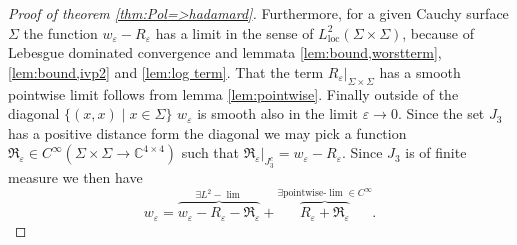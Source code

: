 \documentclass[b5paper,draft,openbib,12pt]{memoir}
\begin{document}
\begin{proof}[Proof of theorem \ref{thm:Pol=>hadamard}]
Furthermore, for a given Cauchy surface \(\Sigma\) the function \(w_\varepsilon-R_\varepsilon\) has a limit in the sense of \(L^2_{\text{loc}}(\Sigma\times\Sigma)\),
because of
Lebesgue dominated convergence and
lemmata \ref{lem:bound,worstterm}, \ref{lem:bound,ivp2} and 
\ref{lem:log term}. That the term \(R_\varepsilon|_{\Sigma\times\Sigma}\) 
has a smooth pointwise limit follows from lemma \ref{lem:pointwise}.
Finally outside of the diagonal \(\{(x,x)\mid x\in \Sigma\}\)
 \(w_\varepsilon\) is smooth also in the limit
\(\varepsilon\rightarrow 0\). Since the set \(J_3\) has 
a positive distance form the diagonal we may pick a function 
\(\mathfrak{R}_\varepsilon\in C^\infty(\Sigma\times\Sigma\rightarrow \mathbb{C}^{4\times 4})\)
such that 
\(\mathfrak{R}_\varepsilon|_{J_3^c}=w_{\varepsilon}-R_{\varepsilon}\). 
Since \(J_3\) is of 
finite measure we then have 
\begin{equation}
  w_\varepsilon = \overbrace{w_\varepsilon-R_{\varepsilon}-\mathfrak{R}_\varepsilon}^{\exists L^2-\lim } + \overbrace{R_{\varepsilon}+ \mathfrak{R}_\varepsilon}^{\exists \text{pointwise-}\lim \in C^\infty}.
\end{equation}

\end{proof}



\backmatter
\appendix



\end{document}
